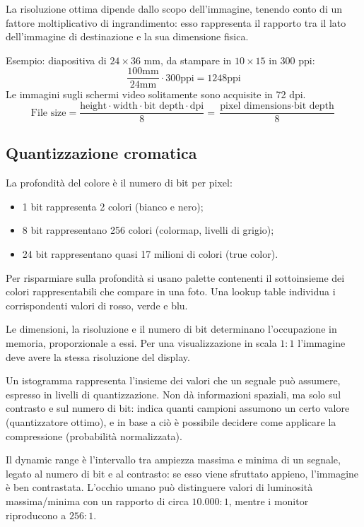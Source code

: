 La risoluzione ottima dipende dallo scopo dell'immagine, tenendo conto di un fattore moltiplicativo di ingrandimento: esso rappresenta il rapporto tra il lato dell'immagine di destinazione e la sua dimensione fisica.

Esempio: diapositiva di $24\times36$ mm, da stampare in $10\times15$ in 300 ppi:
$$\frac{100\text{mm}}{24\text{mm}} \cdot 300\text{ppi} = 1248 \text{ppi}$$
Le immagini sugli schermi video solitamente sono acquisite in 72 dpi.
$$ \text{File size} = \frac{\text{height} \cdot \text{width} \cdot \text{bit depth} \cdot \text{dpi}}{8} = \frac{\text{pixel dimensions} \cdot \text{bit depth}}{8}$$

\subsection{Quantizzazione cromatica}
La profondità del colore è il numero di bit per pixel:
\begin{itemize}
	\item 1 bit rappresenta 2 colori (bianco e nero);
	\item 8 bit rappresentano 256 colori (colormap, livelli di grigio);
	\item 24 bit rappresentano quasi 17 milioni di colori (true color).
\end{itemize}

Per risparmiare sulla profondità si usano palette contenenti il sottoinsieme dei colori rappresentabili che compare in una foto. Una lookup table individua i corrispondenti valori di rosso, verde e blu.

Le dimensioni, la risoluzione e il numero di bit determinano l'occupazione in memoria, proporzionale a essi. Per una visualizzazione in scala $1 : 1$ l'immagine deve avere la stessa risoluzione del display.

Un istogramma rappresenta l'insieme dei valori che un segnale può assumere, espresso in livelli di quantizzazione. Non dà informazioni spaziali, ma solo sul contrasto e sul numero di bit: indica quanti campioni assumono un certo valore (quantizzatore ottimo), e in base a ciò è possibile decidere come applicare la compressione (probabilità normalizzata).

Il dynamic range è l'intervallo tra ampiezza massima e minima di un segnale, legato al numero di bit e al contrasto: se esso viene sfruttato appieno, l'immagine è ben contrastata. L'occhio umano può distinguere valori di luminosità massima/minima con un rapporto di circa $10.000 : 1$, mentre i monitor riproducono a $256 : 1$.

